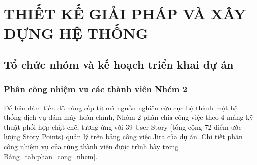
\chapter{THIẾT KẾ GIẢI PHÁP VÀ XÂY DỰNG HỆ THỐNG}
\label{chap:thiet_ke}

\section{Tổ chức nhóm và kế hoạch triển khai dự án}
\label{sec:to_chuc_ke_hoach}

\subsection{Phân công nhiệm vụ các thành viên Nhóm 2}
\label{subsec:phan_cong_nhom}

Để bảo đảm tiến độ nâng cấp từ mã nguồn nghiên cứu cục bộ thành một hệ thống dịch vụ đám mây hoàn chỉnh, Nhóm 2 phân chia công việc theo 4 mảng kỹ thuật phối hợp chặt chẽ, tương ứng với 39 User Story (tổng cộng 72 điểm ước lượng Story Points) quản lý trên bảng công việc Jira của dự án. Chi tiết phân công nhiệm vụ của từng thành viên được trình bày trong Bảng~\ref{tab:phan_cong_nhom}.

